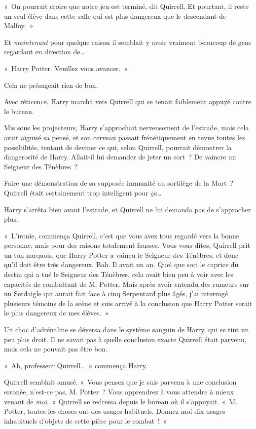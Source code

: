«~On pourrait croire que notre jeu est terminé, dit Quirrell.
Et pourtant, il reste un seul élève dans cette salle qui est plus dangereux que le descendant de Malfoy.~»

Et \emph{maintenant} pour quelque raison il semblait y avoir vraiment beaucoup de gens regardant en direction de…

«~Harry Potter. Veuillez vous avancer.~»

Cela ne présageait rien de bon.

Avec réticence, Harry marcha vers Quirrell qui se tenait faiblement appuyé contre le bureau.

Mis sous les projecteurs, Harry s'approchait nerveusement de l'estrade, mais cela avait aiguisé sa pensé, et son cerveau passait frénétiquement en revue toutes les possibilités, tentant de deviner ce qui, selon Quirrell, pourrait démontrer la dangerosité de Harry.
Allait-il lui demander de jeter un sort~?
De vaincre un Seigneur des Ténèbres~?

Faire une démonstration de sa supposée immunité au sortilège de la Mort~?
Quirrell était certainement trop intelligent pour \emph{ça}…

Harry s'arrêta bien avant l'estrade, et Quirrell ne lui demanda pas de s'approcher plus.

«~L'ironie, commença Quirrell, c'est que vous avez tous regardé vers la bonne personne, mais pour des raisons totalement fausses.
Vous vous dites, Quirrell prit un ton narquois, que Harry Potter a vaincu le Seigneur des Ténèbres, et donc qu'il doit être très dangereux.
Bah. Il avait un an.
Quel que soit le caprice du destin qui a tué le Seigneur des Ténèbres, cela avait bien peu à voir avec les capacités de combattant de M. Potter.
Mais après avoir entendu des rumeurs sur un Serdaigle qui aurait fait face à cinq Serpentard plus âgés, j'ai interrogé plusieurs témoins de la scène et suis arrivé à la conclusion que Harry Potter serait le plus dangereux de mes élèves.~»

Un choc d'adrénaline se déversa dans le système sanguin de Harry, qui se tint un peu plus droit.
Il ne savait pas à quelle conclusion exacte Quirrell était parvenu, mais cela ne pouvait pas être bon.

«~Ah, professeur Quirrell…~» commença Harry.

Quirrell semblait amusé.
«~Vous pensez que je suis parvenu à une conclusion erronée, n'est-ce pas, M. Potter~?
Vous apprendrez à vous attendre à mieux venant de \emph{moi}.~»
Quirrell se redressa depuis le bureau où il s'appuyait.
«~M. Potter, toutes les choses ont des usages habituels.
Donnez-moi dix usages inhabituels d'objets de cette pièce pour le combat~!~»

